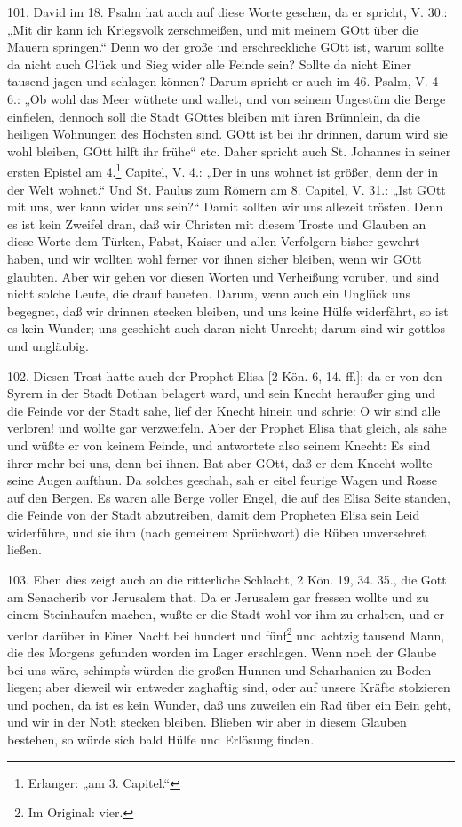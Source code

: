101. David im 18. Psalm hat auch auf diese Worte gesehen, da er spricht, V. 30.: „Mit dir kann ich Kriegsvolk zerschmeißen, und mit meinem GOtt über die Mauern springen.“ Denn wo der große und erschreckliche GOtt ist, warum sollte da nicht auch Glück und Sieg wider alle Feinde sein? Sollte da nicht Einer tausend jagen und schlagen können? Darum spricht er auch im 46. Psalm, V. 4–6.: „Ob wohl das Meer wüthete und wallet, und von seinem Ungestüm die Berge einfielen, dennoch soll die Stadt GOttes bleiben mit ihren Brünnlein, da die heiligen Wohnungen des Höchsten sind. GOtt ist bei ihr drinnen, darum wird sie wohl bleiben, GOtt hilft ihr frühe“ etc. Daher spricht auch St. Johannes in seiner ersten Epistel am 4.\footnote{Erlanger: „am 3. Capitel.“} Capitel, V. 4.: „Der in uns wohnet ist größer, denn der in der Welt wohnet.“ Und St. Paulus zum Römern am 8. Capitel, V. 31.: „Ist GOtt mit uns, wer kann wider uns sein?“ Damit sollten wir uns allezeit trösten. Denn es ist kein Zweifel dran, daß wir Christen mit diesem Troste und Glauben an diese Worte dem Türken, Pabst, Kaiser und allen Verfolgern bisher gewehrt haben, und wir wollten wohl ferner vor ihnen sicher bleiben, wenn wir GOtt glaubten. Aber wir gehen vor diesen Worten und Verheißung vorüber, und sind nicht solche Leute, die drauf baueten. Darum, wenn auch ein Unglück uns begegnet, daß wir drinnen stecken bleiben, und uns keine Hülfe widerfährt, so ist es kein Wunder; uns geschieht auch daran nicht Unrecht; darum sind wir gottlos und ungläubig.

102. Diesen Trost hatte auch der Prophet Elisa [2 Kön. 6, 14. ff.]; da er von den Syrern in der Stadt Dothan belagert ward, und sein Knecht heraußer ging und die Feinde vor der Stadt sahe, lief der Knecht hinein und schrie: O wir sind alle verloren! und wollte gar verzweifeln. Aber der Prophet Elisa that gleich, als sähe und wüßte er von keinem Feinde, und antwortete also seinem Knecht: Es sind ihrer mehr bei uns, denn bei ihnen. Bat aber GOtt, daß er dem Knecht wollte seine Augen aufthun. Da solches geschah, sah er eitel feurige Wagen und Rosse auf den Bergen. Es waren alle Berge voller Engel, die auf des Elisa Seite standen, die Feinde von der Stadt abzutreiben,
damit dem Propheten Elisa sein Leid widerführe, und sie ihm (nach gemeinem Sprüchwort) die Rüben unversehret ließen.

103. Eben dies zeigt auch an die ritterliche Schlacht, 2 Kön. 19, 34. 35., die Gott am Senacherib vor Jerusalem that. Da er Jerusalem gar fressen wollte und zu einem Steinhaufen machen, wußte er die Stadt wohl vor ihm zu erhalten, und er verlor darüber in Einer Nacht bei hundert und fünf\footnote{Im Original: vier.} und achtzig tausend Mann, die des Morgens gefunden worden im Lager erschlagen. Wenn noch der Glaube bei uns wäre, schimpfs würden die großen Hunnen und Scharhanien zu Boden liegen; aber dieweil wir entweder zaghaftig sind, oder auf unsere Kräfte stolzieren und pochen, da ist es kein Wunder, daß uns zuweilen ein Rad über ein Bein geht, und wir in der Noth stecken bleiben. Blieben wir aber in diesem Glauben bestehen, so würde sich bald Hülfe und Erlösung finden.

